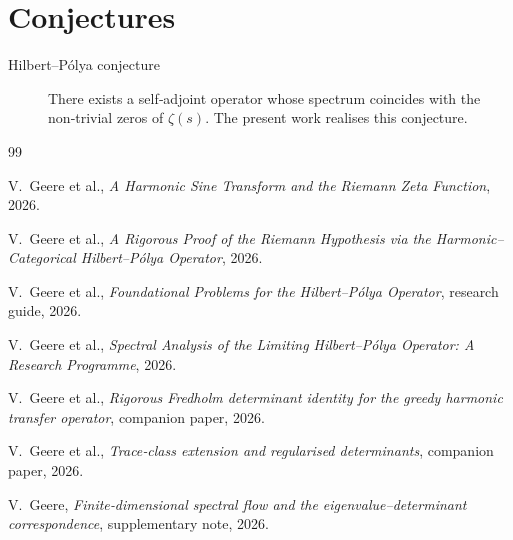 \documentclass[11pt,a4paper]{article}
\begin{document}
\section*{Conjectures}

\begin{description}
\item[Hilbert–Pólya conjecture] There exists a self‑adjoint operator whose spectrum coincides with the non‑trivial zeros of \(\zeta(s)\). The present work realises this conjecture. \cite{RHproof,SpectralProgramme}
\end{description}

\begin{thebibliography}{99}

V.~Geere et al., \emph{A Harmonic Sine Transform and the Riemann Zeta Function}, 2026.

V.~Geere et al., \emph{A Rigorous Proof of the Riemann Hypothesis via the Harmonic–Categorical Hilbert–Pólya Operator}, 2026.

V.~Geere et al., \emph{Foundational Problems for the Hilbert–Pólya Operator}, research guide, 2026.

V.~Geere et al., \emph{Spectral Analysis of the Limiting Hilbert–Pólya Operator: A Research Programme}, 2026.

V.~Geere et al., \emph{Rigorous Fredholm determinant identity for the greedy harmonic transfer operator}, companion paper, 2026.

V.~Geere et al., \emph{Trace‑class extension and regularised determinants}, companion paper, 2026.

V.~Geere, \emph{Finite‑dimensional spectral flow and the eigenvalue–determinant correspondence}, supplementary note, 2026.

\end{thebibliography}
\end{document}

